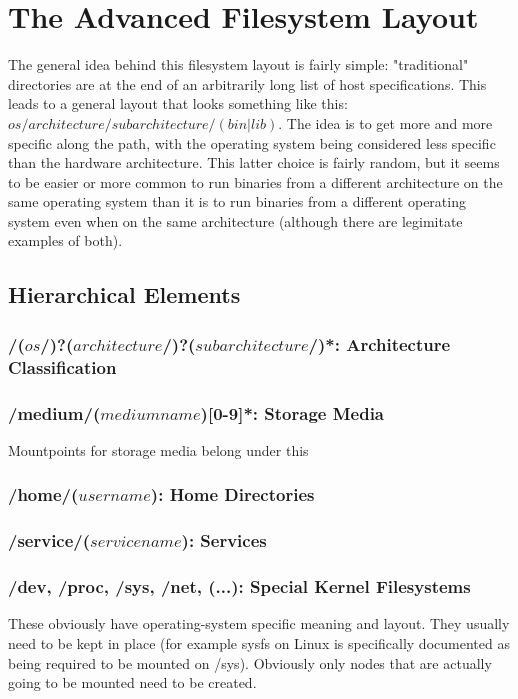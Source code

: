 \documentclass[a4paper,twoside,titlepage]{article}
\begin{document}
\newpage

\section{The Advanced Filesystem Layout}
The general idea behind this filesystem layout is fairly simple: "traditional"
directories are at the end of an arbitrarily long list of host specifications.
This leads to a general layout that looks something like this:
$os/architecture/subarchitecture/(bin|lib)$. The idea is to get more and more
specific along the path, with the operating system being considered less
specific than the hardware architecture. This latter choice is fairly random,
but it seems to be easier or more common to run binaries from a different
architecture on the same operating system than it is to run binaries from a
different operating system even when on the same architecture (although there
are legimitate examples of both).

\subsection{Hierarchical Elements}

\subsubsection{/($os$/)?($architecture$/)?($subarchitecture$/)*: Architecture
Classification}

\subsubsection{/medium/($mediumname$)[0-9]*: Storage Media}
Mountpoints for storage media belong under this

\subsubsection{/home/($username$): Home Directories}

\subsubsection{/service/($servicename$): Services}

\subsubsection{/dev, /proc, /sys, /net, (...): Special Kernel Filesystems}
These obviously have operating-system specific meaning and layout. They usually
need to be kept in place (for example sysfs on Linux is specifically documented
as being required to be mounted on /sys). Obviously only nodes that are actually
going to be mounted need to be created.
\end{document}
